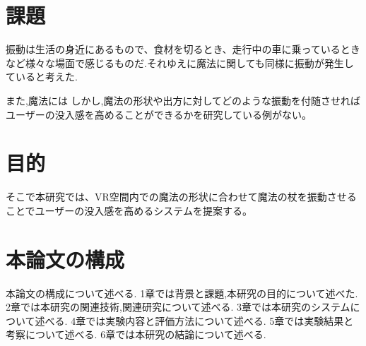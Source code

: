 \section{課題}
振動は生活の身近にあるもので、食材を切るとき、走行中の車に乗っているときなど様々な場面で感じるものだ.それゆえに魔法に関しても同様に振動が発生していると考えた.


また,魔法には
しかし,魔法の形状や出方に対してどのような振動を付随させればユーザーの没入感を高めることができるかを研究している例がない。



\section{目的}
そこで本研究では、VR空間内での魔法の形状に合わせて魔法の杖を振動させることでユーザーの没入感を高めるシステムを提案する。

\section{本論文の構成}
本論文の構成について述べる.
1章では背景と課題,本研究の目的について述べた.
2章では本研究の関連技術,関連研究について述べる.
3章では本研究のシステムについて述べる.
4章では実験内容と評価方法について述べる.
5章では実験結果と考察について述べる.
6章では本研究の結論について述べる.




\begin{comment}
    \textblockcolour{PowderBlue}
    \begin{textblock}{10}(6.5, 15.8)
        見出しの深さの最大値は研究室や分野によって異なる。
        
        教員の指示に従うこと。一般論として4段は深すぎ？
    \end{textblock}
\end{comment}






